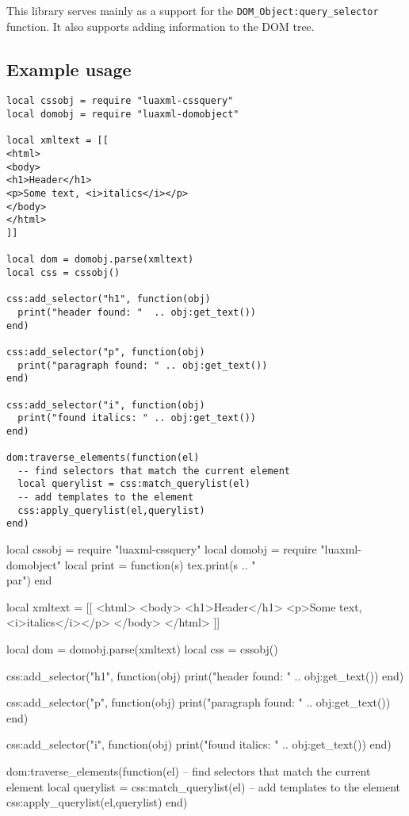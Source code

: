 \documentclass{ltxdoc}
\begin{document}
This library serves mainly as a support for the
\texttt{DOM\_Object:query\_selector} function. It also supports adding
information to the DOM tree.

\subsection{Example usage}

\begin{verbatim}
local cssobj = require "luaxml-cssquery"
local domobj = require "luaxml-domobject"

local xmltext = [[
<html>
<body>
<h1>Header</h1>
<p>Some text, <i>italics</i></p>
</body>
</html>
]]

local dom = domobj.parse(xmltext)
local css = cssobj()

css:add_selector("h1", function(obj)
  print("header found: "  .. obj:get_text())
end)

css:add_selector("p", function(obj)
  print("paragraph found: " .. obj:get_text())
end)

css:add_selector("i", function(obj)
  print("found italics: " .. obj:get_text())
end)

dom:traverse_elements(function(el)
  -- find selectors that match the current element
  local querylist = css:match_querylist(el)
  -- add templates to the element
  css:apply_querylist(el,querylist)
end)
\end{verbatim}

\begin{framed}
  \begin{luacode*}
local cssobj = require "luaxml-cssquery"
local domobj = require "luaxml-domobject"
local print = function(s) tex.print(s .. "\\par") end

local xmltext = [[
<html>
<body>
<h1>Header</h1>
<p>Some text, <i>italics</i></p>
</body>
</html>
]]

local dom = domobj.parse(xmltext)
local css = cssobj()

css:add_selector("h1", function(obj)
  print("header found: "  .. obj:get_text())
end)

css:add_selector("p", function(obj)
  print("paragraph found: " .. obj:get_text())
end)

css:add_selector("i", function(obj)
  print("found italics: " .. obj:get_text())
end)

dom:traverse_elements(function(el)
  -- find selectors that match the current element
  local querylist = css:match_querylist(el)
  -- add templates to the element
  css:apply_querylist(el,querylist)
end)
  \end{luacode*}
\end{framed}
\end{document}
